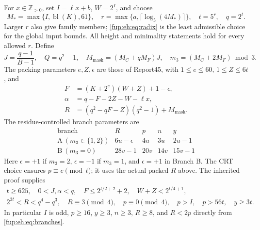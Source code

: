 \documentclass[11pt,letterpaper]{article}
\theoremstyle{definition}\newtheorem{definition}[theorem]{Definition}
\theoremstyle{remark}\newtheorem{remark}[theorem]{Remark}
\newcommand{\pos}{\mathbb Z_{>0}}
\newcommand{\bl}{\operatorname{bl}}
\begin{document}
For $x\in\pos$, set $I=\ell x+b$, $W=2^I$, and choose
\begin{equation}\label{fup:eh:eq:radix}
 M_*=\max\{I,\bl(K),61\},\quad
 r=\max\{a,\lceil\log_5(4M_*)\rceil\},\quad t=5^r,\quad q=2^t.
\end{equation}
Larger $r$ also give family members; \eqref{fup:eh:eq:radix} is the least
admissible choice for the global input bounds. All height and minimality
statements hold for every allowed $r$. Define
\[
 J=\frac{q-1}{B-1},\quad Q=q^2-1,\quad
 M_{\mathrm{mask}}=(M_C+qM_F)J,\quad m_3=(M_C+2M_F)\bmod3.
\]
The packing parameters $e,Z,\epsilon$ are those of Report45, with
$1\le e\le60$, $1\le Z\le6t$, and
\begin{align}
 F&=(K+2^e)(W+Z)+1-\epsilon,\label{fup:eh:eq:pack}\\
 \alpha&=q-F-2Z-W-\ell x,\nonumber\\
 R&=(q^2-qF-Z)(q^2-1)+M_{\mathrm{mask}}.\nonumber
\end{align}
The residue-controlled branch parameters are
\begin{equation}\label{fup:eh:eq:branches}
\begin{array}{c|c|c|c|c}
\text{branch}&R&p&n&y\\\hline
\mathrm A\ (m_3\in\{1,2\})&6u-\epsilon&4u&3u&2u-1\\
\mathrm B\ (m_3=0)&28v-1&20v&14v&15v-1
\end{array}
\end{equation}
Here $\epsilon=+1$ if $m_3=2$, $\epsilon=-1$ if $m_3=1$,
and $\epsilon=+1$ in Branch B. The CRT choice ensures
$p\equiv e\pmod t$; it uses the actual packed $R$ above.
The inherited proof supplies
\begin{gather}
 t\ge625,\quad 0<J,\alpha<q,\quad
 F\le 2^{t/2+2}+2,\quad W+Z<2^{t/4+1},\label{fup:eh:eq:outerbounds}\\
 2^{3t}<R<q^4-q^3,\quad R\equiv3\pmod4,\quad
 p\equiv0\pmod4,\quad p>I,\quad p>56t,\quad y\ge3t.\label{fup:eh:eq:rankbounds}
\end{gather}
In particular $I$ is odd, $p\ge16$, $y\ge3$, $n\ge3$, $R\ge8$,
and $R<2p$ directly from \eqref{fup:eh:eq:branches}.
\end{document}
